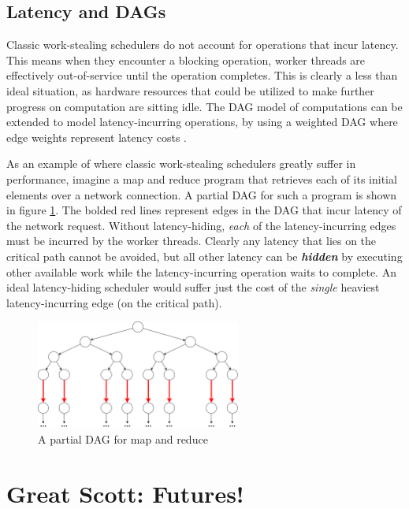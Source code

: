 \documentclass[bsc,frontabs,singlespacing,parskip,deptreport,normalheadings]{infthesis}
\begin{document}
\subsection{Latency and DAGs}

Classic work-stealing schedulers do not account for operations that incur
latency. This means when they encounter a blocking operation, worker threads are
effectively out-of-service until the operation completes. This is clearly a less
than ideal situation, as hardware resources that could be utilized to make
further progress on computation are sitting idle. The DAG model of computations
can be extended to model latency-incurring operations, by using a weighted DAG
where edge weights represent latency costs \cite{muller_latency-hiding_2016}.

As an example of where classic work-stealing schedulers greatly suffer in
performance, imagine a map and reduce program that retrieves each of its initial
elements over a network connection. A partial DAG for such a program is shown in figure
\ref{fig:map-reduce-dag}. The bolded red lines represent edges in the
DAG that incur latency of the network request. Without latency-hiding,
\textit{each} of the latency-incurring edges must be incurred by the worker
threads. Clearly any latency that lies on the critical path cannot be avoided,
but all other latency can be \textbf{\textit{hidden}} by executing other
available work while the latency-incurring operation waits to complete. An ideal
latency-hiding scheduler would suffer just the cost of the \textit{single}
heaviest latency-incurring edge (on the critical path).

\begin{figure}[ht]
    \centering
    \includegraphics[width=0.6\textwidth]{figures/map-reduce.png}
    \caption{A partial DAG for map and reduce}
    \label{fig:map-reduce-dag}
\end{figure}

\section{Great Scott: Futures!}
\label{section:futures}
\end{document}
